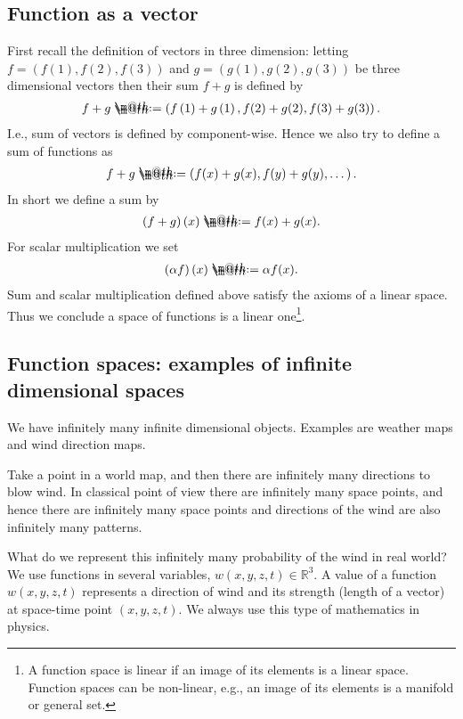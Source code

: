 \documentclass[openany, a4paper, oneside]{book}
\makeatletter
\newcommand*{\defeq}{\mathrel{\rlap{%
\raisebox{0.3ex}{$\m@th\cdot$}}%
\raisebox{-0.3ex}{$\m@th\cdot$}}%
=}
\theoremstyle{break}
\theoremstyle{breakdefn}
\newcommand{\rbk}[1]{\left (#1\right)}
\newcommand{\bbR}{\mathbb{R}}
\makeatother
\begin{document}
\subsection{Function as a vector}
\label{sec-4-1-2-4}

First recall the definition of vectors in three dimension:
letting $f = (f(1), f(2), f(3))$ and $g = (g(1), g(2), g(3))$ be three dimensional vectors
then their sum $f + g$ is defined by
\begin{align}
 f + g
 \defeq
 \rbk{f\rbk{1} + g \rbk{1}, f(2) + g(2), f(3) + g(3)}.
\end{align}
I.e., sum of vectors is defined by component-wise.
Hence we also try to define a sum of functions as
\begin{align}
 f + g
 \defeq
 \rbk{f(x) + g(x), f(y) + g(y), \dots}.
\end{align}
In short we define a sum by
\begin{align}
 \rbk{f + g} (x)
 \defeq
 f(x) + g(x).
\end{align}
For scalar multiplication we set
\begin{align}
 \rbk{\alpha f} (x)
 \defeq
 \alpha f (x).
\end{align}
Sum and scalar multiplication defined above satisfy the axioms of a linear space.
Thus we conclude a space of functions is a linear one\footnote{A function space is linear if an image of its elements is a linear space.
Function spaces can be non-linear, e.g., an image of its elements is a manifold or general set.
 }.
\subsection{Function spaces: examples of infinite dimensional spaces}
\label{sec-4-1-2-5}

We have infinitely many infinite dimensional objects.
Examples are weather maps and wind direction maps.

Take a point in a world map,
and then there are infinitely many directions to blow wind.
In classical point of view there are infinitely many space points,
and hence there are infinitely many space points and
directions of the wind are also infinitely many patterns.

What do we represent this infinitely many probability of the wind in real world?
We use functions in several variables, $w(x,y,z,t) \in \bbR^3$.
A value of a function $w(x,y,z,t)$ represents a direction of wind and its strength (length of a vector)
at space-time point $\rbk{x, y, z, t}$.
We always use this type of mathematics in physics.
\end{document}
